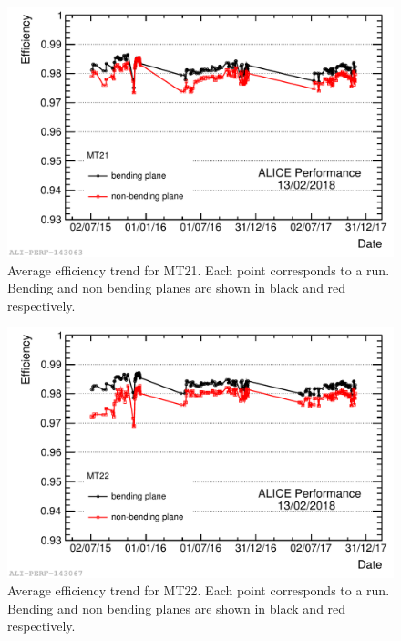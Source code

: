 \begin{figure}[!hb]
\begin{center}
\includegraphics[width=0.8\linewidth]{Chapters/Performance/Figs/2018-Feb-16-effTrend_2015-2017_Ch13.pdf}
\caption{Average efficiency trend for MT21. Each point corresponds to a run. Bending and non bending planes are shown in black and red respectively.}
\label{fig:MTR21efficiency}
\end{center}
\end{figure}

\begin{figure}[!ht]
\begin{center}
\includegraphics[width=0.8\linewidth]{Chapters/Performance/Figs/2018-Feb-16-effTrend_2015-2017_Ch14.pdf}
\caption{Average efficiency trend for MT22. Each point corresponds to a run. Bending and non bending planes are shown in black and red respectively.}
\label{fig:MTR22efficiency}
\end{center}
\end{figure}

